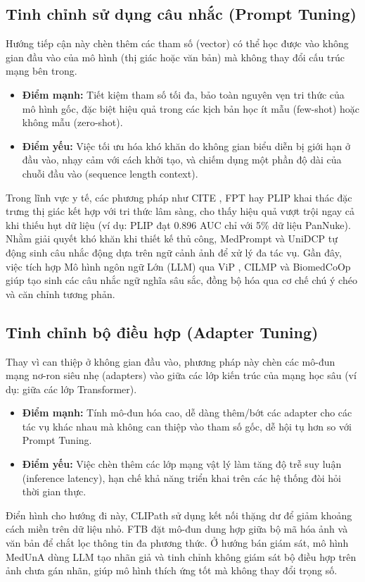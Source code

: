 \subsection{Tinh chỉnh sử dụng câu nhắc (Prompt Tuning)}
Hướng tiếp cận này chèn thêm các tham số (vector) có thể học được vào không gian đầu vào của mô hình (thị giác hoặc văn bản) mà không thay đổi cấu trúc mạng bên trong. 
\begin{itemize}
    \item \textbf{Điểm mạnh:} Tiết kiệm tham số tối đa, bảo toàn nguyên vẹn tri thức của mô hình gốc, đặc biệt hiệu quả trong các kịch bản học ít mẫu (few-shot) hoặc không mẫu (zero-shot).
    \item \textbf{Điểm yếu:} Việc tối ưu hóa khó khăn do không gian biểu diễn bị giới hạn ở đầu vào, nhạy cảm với cách khởi tạo, và chiếm dụng một phần độ dài của chuỗi đầu vào (sequence length context).
\end{itemize}
Trong lĩnh vực y tế, các phương pháp như CITE \cite{CITE}, FPT \cite{FPT} hay PLIP \cite{PLIP} khai thác đặc trưng thị giác kết hợp với tri thức lâm sàng, cho thấy hiệu quả vượt trội ngay cả khi thiếu hụt dữ liệu (ví dụ: PLIP đạt 0.896 AUC chỉ với 5\% dữ liệu PanNuke). Nhằm giải quyết khó khăn khi thiết kế thủ công, MedPrompt \cite{MedPrompt} và UniDCP \cite{UniDCP} tự động sinh câu nhắc động dựa trên ngữ cảnh ảnh để xử lý đa tác vụ. Gần đây, việc tích hợp Mô hình ngôn ngữ Lớn (LLM) qua ViP \cite{ViP}, CILMP \cite{CLIMP} và BiomedCoOp \cite{BiomedCoOp} giúp tạo sinh các câu nhắc ngữ nghĩa sâu sắc, đồng bộ hóa qua cơ chế chú ý chéo và căn chỉnh tương phản.

\subsection{Tinh chỉnh bộ điều hợp (Adapter Tuning)}
Thay vì can thiệp ở không gian đầu vào, phương pháp này chèn các mô-đun mạng nơ-ron siêu nhẹ (adapters) vào giữa các lớp kiến trúc của mạng học sâu (ví dụ: giữa các lớp Transformer).
\begin{itemize}
    \item \textbf{Điểm mạnh:} Tính mô-đun hóa cao, dễ dàng thêm/bớt các adapter cho các tác vụ khác nhau mà không can thiệp vào tham số gốc, dễ hội tụ hơn so với Prompt Tuning.
    \item \textbf{Điểm yếu:} Việc chèn thêm các lớp mạng vật lý làm tăng độ trễ suy luận (inference latency), hạn chế khả năng triển khai trên các hệ thống đòi hỏi thời gian thực.
\end{itemize}
Điển hình cho hướng đi này, CLIPath \cite{CLIPath} sử dụng kết nối thặng dư để giảm khoảng cách miền trên dữ liệu nhỏ. FTB \cite{FTB} đặt mô-đun dung hợp giữa bộ mã hóa ảnh và văn bản để chắt lọc thông tin đa phương thức. Ở hướng bán giám sát, mô hình MedUnA \cite{MedUnA} dùng LLM tạo nhãn giả và tinh chỉnh không giám sát bộ điều hợp trên ảnh chưa gán nhãn, giúp mô hình thích ứng tốt mà không thay đổi trọng số.

